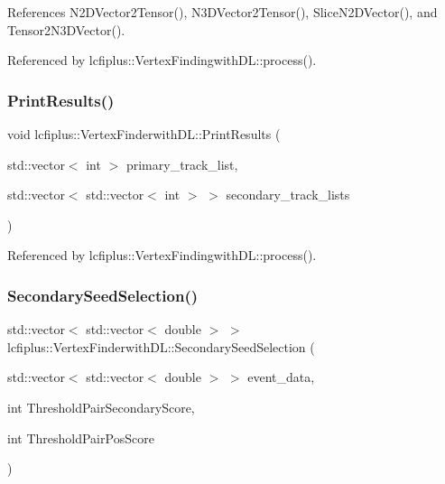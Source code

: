 References N2\+D\+Vector2\+Tensor(), N3\+D\+Vector2\+Tensor(), Slice\+N2\+D\+Vector(), and Tensor2\+N3\+D\+Vector().



Referenced by lcfiplus\+::\+Vertex\+Findingwith\+D\+L\+::process().

\mbox{\label{namespacelcfiplus_1_1VertexFinderwithDL_a3012f2cb205b006e9ccf3877afcee260}} 
\subsubsection{Print\+Results()}
{\footnotesize\ttfamily void lcfiplus\+::\+Vertex\+Finderwith\+D\+L\+::\+Print\+Results (\begin{DoxyParamCaption}\item[{std\+::vector$<$ int $>$}]{primary\+\_\+track\+\_\+list,  }\item[{std\+::vector$<$ std\+::vector$<$ int $>$ $>$}]{secondary\+\_\+track\+\_\+lists }\end{DoxyParamCaption})}



Referenced by lcfiplus\+::\+Vertex\+Findingwith\+D\+L\+::process().

\mbox{\label{namespacelcfiplus_1_1VertexFinderwithDL_a669c6d7a52ada7d54dce25ed1726232a}} 
\subsubsection{Secondary\+Seed\+Selection()}
{\footnotesize\ttfamily std\+::vector$<$ std\+::vector$<$ double $>$ $>$ lcfiplus\+::\+Vertex\+Finderwith\+D\+L\+::\+Secondary\+Seed\+Selection (\begin{DoxyParamCaption}\item[{std\+::vector$<$ std\+::vector$<$ double $>$ $>$}]{event\+\_\+data,  }\item[{int}]{Threshold\+Pair\+Secondary\+Score,  }\item[{int}]{Threshold\+Pair\+Pos\+Score }\end{DoxyParamCaption})}



